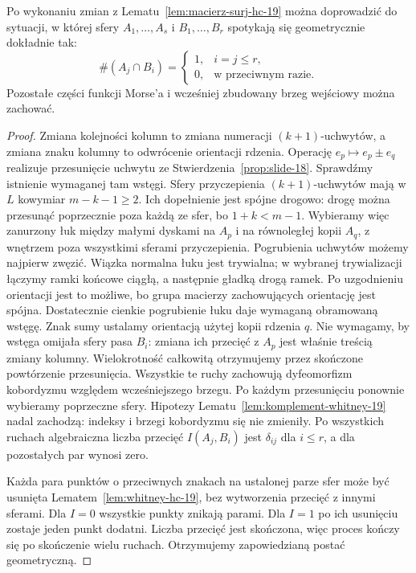 \begin{stwierdzenie}
\label{prop:realizacja-hc-19}
Po wykonaniu zmian z
Lematu~\ref{lem:macierz-surj-hc-19}
można doprowadzić do sytuacji,
w której sfery
$A_1,\ldots,A_s$ i
$B_1,\ldots,B_r$
spotykają się geometrycznie
dokładnie tak:
\[
 \#(A_j\cap B_i)=
 \begin{cases}
  1,& i=j\leq r,\\
  0,& \text{w przeciwnym razie}.
 \end{cases}
\]
Pozostałe części funkcji Morse'a
i wcześniej zbudowany brzeg
wejściowy można zachować.
\end{stwierdzenie}
\begin{proof}
Zmiana kolejności kolumn
to zmiana numeracji
$(k+1)$-uchwytów,
a zmiana znaku kolumny
to odwrócenie orientacji
rdzenia. Operację
$e_p\mapsto e_p\pm e_q$
realizuje przesunięcie uchwytu ze
Stwierdzenia~\ref{prop:slide-18}.
Sprawdźmy istnienie wymaganej tam wstęgi. Sfery przyczepienia
$(k+1)$-uchwytów mają w $L$ kowymiar $m-k-1\geq2$.
Ich dopełnienie jest spójne drogowo: drogę można przesunąć
poprzecznie poza każdą ze sfer, bo $1+k<m-1$.
Wybieramy więc zanurzony łuk między małymi dyskami na $A_p$
i na równoległej kopii $A_q$, z wnętrzem poza wszystkimi sferami
przyczepienia. Pogrubienia uchwytów możemy najpierw zwęzić.
Wiązka normalna łuku jest trywialna; w wybranej trywializacji
łączymy ramki końcowe ciągłą, a następnie gładką drogą ramek.
Po uzgodnieniu orientacji jest to możliwe, bo grupa macierzy
zachowujących orientację jest spójna. Dostatecznie cienkie
pogrubienie łuku daje wymaganą obramowaną wstęgę.
Znak sumy ustalamy orientacją użytej kopii rdzenia $q$.
Nie wymagamy, by wstęga omijała sfery pasa $B_i$:
zmiana ich przecięć z $A_p$ jest właśnie treścią zmiany kolumny.
Wielokrotność całkowitą
otrzymujemy przez
skończone powtórzenie
przesunięcia.
Wszystkie te ruchy
zachowują dyfeomorfizm
kobordyzmu względem
wcześniejszego brzegu.
Po każdym przesunięciu ponownie wybieramy poprzeczne sfery.
Hipotezy Lematu~\ref{lem:komplement-whitney-19} nadal zachodzą:
indeksy i brzegi kobordyzmu się nie zmieniły.
Po wszystkich ruchach algebraiczna
liczba przecięć
$I(A_j,B_i)$ jest
$\delta_{ij}$ dla $i\leq r$,
a dla pozostałych par
wynosi zero.

Każda para punktów
o przeciwnych znakach
na ustalonej parze sfer
może być usunięta
Lematem~\ref{lem:whitney-hc-19},
bez wytworzenia przecięć
z innymi sferami.
Dla $I=0$ wszystkie
punkty znikają parami.
Dla $I=1$ po ich
usunięciu zostaje
jeden punkt dodatni.
Liczba przecięć jest
skończona, więc
proces kończy się
po skończenie wielu
ruchach. Otrzymujemy
zapowiedzianą postać
geometryczną.
\end{proof}

